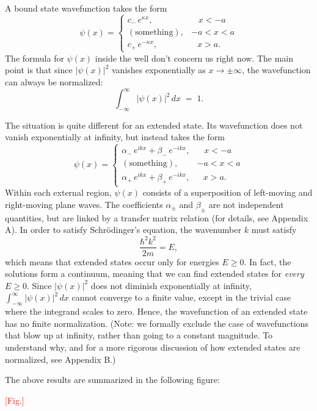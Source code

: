 \documentclass[pra,11pt]{revtex4}
\begin{document}
A bound state wavefunction takes the form
$$\psi(x) = \begin{cases} c_-\, e^{\kappa x}, & \;\;\;x < -a\\ (\mathrm{something}) , & -a < x < a\\ c_+\, e^{-\kappa x} , & \;\;\,x > a.\end{cases}$$
The formula for $\psi(x)$ inside the well don't concern us right now.
The main point is that since $|\psi(x)|^2$ vanishes exponentially as
$x \rightarrow \pm \infty$, the wavefunction can always be
normalized:
$$\int_{-\infty}^\infty |\psi(x)|^2\, dx\; =\; 1.$$

The situation is quite different for an extended state.  Its
wavefunction does not vanish exponentially at infinity, but instead
takes the form
$$\psi(x) = \begin{cases} \alpha_-\, e^{ik x} + \beta_-\, e^{-ik x}, & \;\;\;x < -a\\ (\mathrm{something}) , & -a < x < a\\ \alpha_+\, e^{ik x} + \beta_+\, e^{-ik x} , & \;\;\,x > a.\end{cases}$$
Within each external region, $\psi(x)$ consists of a superposition of
left-moving and right-moving plane waves.  The coefficients
$\alpha_\pm$ and $\beta_\pm$ are not independent quantities, but are
linked by a transfer matrix relation (for details, see Appendix A).
In order to satisfy Schr\"odinger's equation, the wavenumber $k$ must
satisfy
$$\frac{\hbar^2k^2}{2m} = E,$$
which means that extended states occur only for energies $E \ge 0$.
In fact, the solutions form a continuum, meaning that we can find
extended states for \textit{every} $E \ge 0$.  Since $|\psi(x)|^2$
does not diminish exponentially at infinity, $\int_{-\infty}^\infty
|\psi(x)|^2\, dx$ cannot converge to a finite value, except in the
trivial case where the integrand scales to zero.  Hence, the
wavefunction of an extended state has no finite normalization.  (Note:
we formally exclude the case of wavefunctions that blow up at
infinity, rather than going to a constant magnitude.  To understand
why, and for a more rigorous discussion of how extended states are
normalized, see Appendix B.)

The above results are summarized in the following figure:

\textcolor{red}{[Fig.]}

\end{document}
